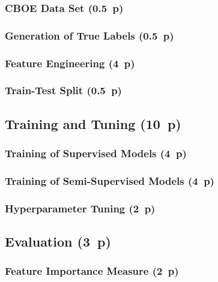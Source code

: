 \subsubsection{CBOE Data Set (0.5~p)}\label{sec:cboe-data-set}

\subsubsection{Generation of True
  Labels (0.5~p)}\label{sec:generation-of-true-labels}

\subsubsection{Feature Engineering (4~p)}\label{sec:feature-engineering}

\subsubsection{Train-Test Split (0.5~p)}\label{sec:train-test-split}

\subsection{Training and Tuning (10~p)}\label{sec:training-and-tuning}

\subsubsection{Training of Supervised
  Models (4~p)}\label{sec:training-of-supervised-models}


\subsubsection{Training of Semi-Supervised
  Models (4~p)}\label{sec:training-of-semi-supervised-models}


\subsubsection{Hyperparameter Tuning (2~p)}\label{sec:hyperparameter-tuning}


\subsection{Evaluation (3~p)}\label{sec:evaluation}

\subsubsection{Feature Importance
  Measure (2~p)}\label{sec:feature-importance-measure}

